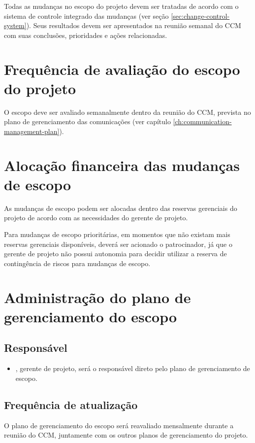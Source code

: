 Todas as mudanças no escopo do projeto devem ser tratadas de acordo com o sistema de controle integrado das mudanças (ver seção \ref{sec:change-control-system}). Seus resultados devem ser apresentados na reunião semanal do CCM com suas conclusões, prioridades e ações relacionadas.

\section{Frequência de avaliação do escopo do projeto}

O escopo deve ser avaliado semanalmente dentro da reunião do CCM, prevista no plano de gerenciamento das comunicações (ver capítulo \ref{ch:communication-management-plan}).

\section{Alocação financeira das mudanças de escopo}

As mudanças de escopo podem ser alocadas dentro das reservas gerenciais do projeto de acordo com as necessidades do gerente de projeto.

Para mudanças de escopo prioritárias, em momentos que não existam mais reservas gerenciais disponíveis, deverá ser acionado o patrocinador, já que o gerente de projeto não possui autonomia para decidir utilizar a reserva de contingência de riscos para mudanças de escopo.

\section{Administração do plano de gerenciamento do escopo}

\subsection{Responsável}

\begin{itemize}
	\item \projectManagerName, gerente de projeto, será o responsável direto pelo plano de gerenciamento de escopo.
\end{itemize}

\subsection{Frequência de atualização}

O plano de gerenciamento do escopo será reavaliado mensalmente durante a reunião do CCM, juntamente com os outros planos de gerenciamento do projeto.


